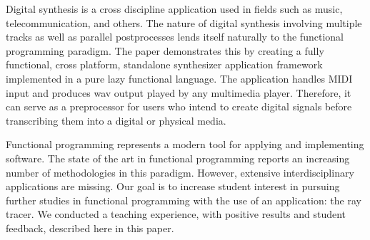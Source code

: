 \documentclass[10pt,a4paper]{altacv}
\begin{document}
\small{Digital synthesis is a cross discipline application used in fields such as music, telecommunication,
and others. The nature of digital synthesis involving multiple tracks as well as parallel postprocesses
lends itself naturally to the functional programming paradigm. The paper demonstrates this by
creating a fully functional, cross platform, standalone synthesizer application framework implemented
in a pure lazy functional language. The application handles MIDI input and produces wav output played
by any multimedia player. Therefore, it can serve as a preprocessor for users who intend to create digital
signals before transcribing them into a digital or physical media.}


\divider

\small{Functional programming represents a modern tool for applying and implementing software. The state
of the art in functional programming reports an increasing number of methodologies in this paradigm.
However, extensive interdisciplinary applications are missing. Our goal is to increase student interest
in pursuing further studies in functional programming with the use of an application: the ray tracer.
We conducted a teaching experience, with positive results and student feedback, described here in
this paper.}

\medskip

\clearpage
\end{document}
